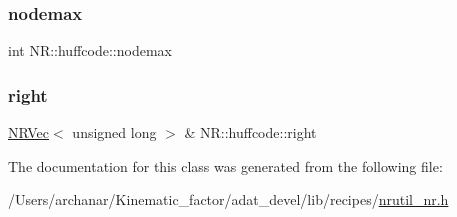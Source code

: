 \subsubsection{\texorpdfstring{nodemax}{nodemax}}
{\footnotesize\ttfamily int N\+R\+::huffcode\+::nodemax}

\mbox{\label{classNR_1_1huffcode_ac4dba36044a7dc9a52678f850fbc2a8c}} 
\subsubsection{\texorpdfstring{right}{right}}
{\footnotesize\ttfamily \mbox{\hyperlink{classNR_1_1NRVec}{N\+R\+Vec}}$<$ unsigned long $>$ \& N\+R\+::huffcode\+::right}



The documentation for this class was generated from the following file\+:\begin{DoxyCompactItemize}
\item 
/\+Users/archanar/\+Kinematic\+\_\+factor/adat\+\_\+devel/lib/recipes/\mbox{\hyperlink{lib_2recipes_2nrutil__nr_8h}{nrutil\+\_\+nr.\+h}}\end{DoxyCompactItemize}
